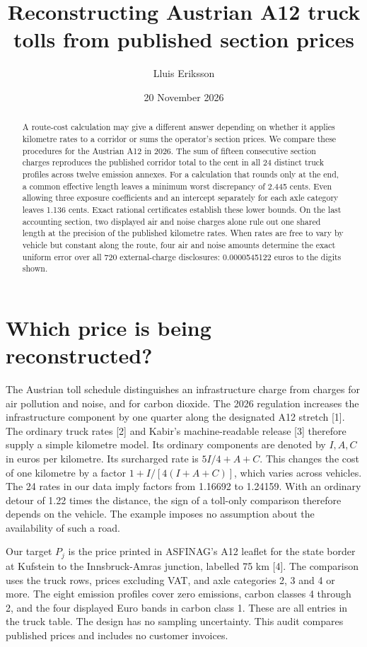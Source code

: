 \documentclass[11pt]{article}
\title{Reconstructing Austrian A12 truck tolls from published section prices}
\author{Lluis Eriksson}
\date{20 November 2026}
\begin{document}
\maketitle
\begin{abstract}
A route-cost calculation may give a different answer depending on whether it applies kilometre rates to a corridor or sums the operator's section prices. We compare these procedures for the Austrian A12 in 2026. The sum of fifteen consecutive section charges reproduces the published corridor total to the cent in all 24 distinct truck profiles across twelve emission annexes. For a calculation that rounds only at the end, a common effective length leaves a minimum worst discrepancy of 2.445 cents. Even allowing three exposure coefficients and an intercept separately for each axle category leaves 1.136 cents. Exact rational certificates establish these lower bounds. On the last accounting section, two displayed air and noise charges alone rule out one shared length at the precision of the published kilometre rates. When rates are free to vary by vehicle but constant along the route, four air and noise amounts determine the exact uniform error over all 720 external-charge disclosures: 0.0000545122 euros to the digits shown.
\end{abstract}

\section{Which price is being reconstructed?}
The Austrian toll schedule distinguishes an infrastructure charge from charges for air pollution and noise, and for carbon dioxide. The 2026 regulation increases the infrastructure component by one quarter along the designated A12 stretch [1]. The ordinary truck rates [2] and Kabir's machine-readable release [3] therefore supply a simple kilometre model. Its ordinary components are denoted by $I,A,C$ in euros per kilometre. Its surcharged rate is $5I/4+A+C$. This changes the cost of one kilometre by a factor $1+I/[4(I+A+C)]$, which varies across vehicles. The 24 rates in our data imply factors from 1.16692 to 1.24159. With an ordinary detour of 1.22 times the distance, the sign of a toll-only comparison therefore depends on the vehicle. The example imposes no assumption about the availability of such a road.

Our target $P_j$ is the price printed in ASFINAG's A12 leaflet for the state border at Kufstein to the Innsbruck-Amras junction, labelled 75 km [4]. The comparison uses the truck rows, prices excluding VAT, and axle categories 2, 3 and 4 or more. The eight emission profiles cover zero emissions, carbon classes 4 through 2, and the four displayed Euro bands in carbon class 1. These are all entries in the truck table. The design has no sampling uncertainty. This audit compares published prices and includes no customer invoices.
\end{document}
